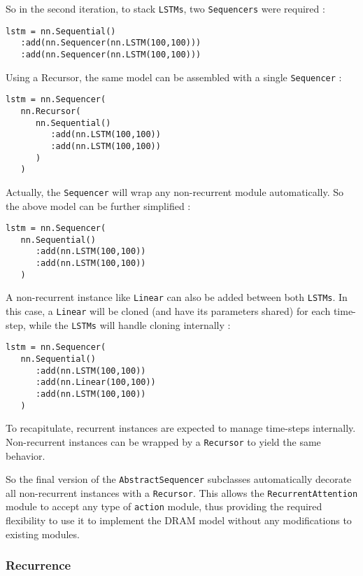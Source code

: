 \documentclass{article} %
\providecommand{\inlinecode}[1]{\texttt{#1}}
\begin{document}
So in the second iteration, to stack \inlinecode{LSTMs}, two \inlinecode{Sequencers} were required :

\begin{verbatim}
lstm = nn.Sequential()
   :add(nn.Sequencer(nn.LSTM(100,100)))
   :add(nn.Sequencer(nn.LSTM(100,100)))
\end{verbatim}

Using a Recursor, the same model can be assembled with a single \inlinecode{Sequencer} :

\begin{verbatim}
lstm = nn.Sequencer(
   nn.Recursor(
      nn.Sequential()
         :add(nn.LSTM(100,100))
         :add(nn.LSTM(100,100))
      )
   )
\end{verbatim}

Actually, the \inlinecode{Sequencer} will wrap any non-recurrent module automatically.
So the above model can be further simplified :

\begin{verbatim}
lstm = nn.Sequencer(
   nn.Sequential()
      :add(nn.LSTM(100,100))
      :add(nn.LSTM(100,100))
   )
\end{verbatim}

A non-recurrent instance like \inlinecode{Linear} can also be added between both \inlinecode{LSTMs}. 
In this case, a \inlinecode{Linear} will be cloned (and have its parameters shared) for each time-step, 
while the \inlinecode{LSTMs} will handle cloning internally :

\begin{verbatim}
lstm = nn.Sequencer(
   nn.Sequential()
      :add(nn.LSTM(100,100))
      :add(nn.Linear(100,100))
      :add(nn.LSTM(100,100))
   )
\end{verbatim}

To recapitulate, recurrent instances are expected to manage time-steps internally. 
Non-recurrent instances can be wrapped by a \inlinecode{Recursor} to yield the same behavior.

So the final version of the \inlinecode{AbstractSequencer} subclasses
automatically decorate all non-recurrent instances with a \inlinecode{Recursor}. 
This allows the \inlinecode{RecurrentAttention} module to accept 
any type of \inlinecode{action} module, thus providing the required flexibility to use it to 
implement the DRAM model without any modifications to existing modules.

\subsubsection{Recurrence}
\end{document}
